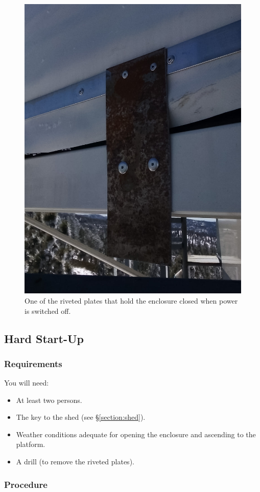 \begin{enumerate}
\begin{figure}
\begin{center}
\includegraphics[width=0.45\linewidth]{figures/operations-riveted-plate.jpg}
\end{center}
\caption{One of the riveted plates that hold the enclosure closed when power is switched off.}
\label{figure:riveted-plates}
\end{figure}

\end{enumerate}

\subsection{Hard Start-Up}

\subsubsection{Requirements}

You will need:
\begin{itemize}
\item At least two persons.
\item The key to the shed (see \S\ref{section:shed}).
\item Weather conditions adequate for opening the enclosure and ascending to the platform.
\item A drill (to remove the riveted plates).
\end{itemize}

\subsubsection{Procedure}


